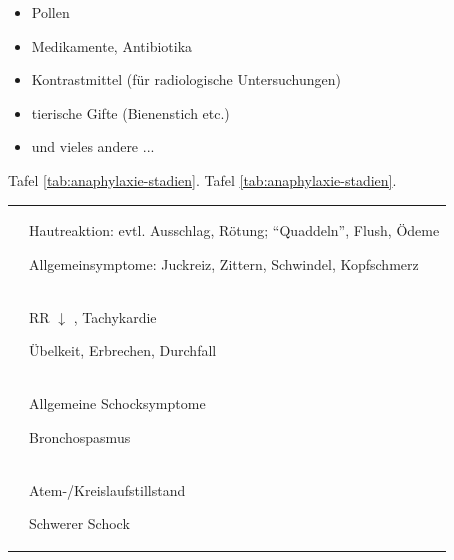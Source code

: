{
\begin{itemize}
    \item Pollen
    \item Medikamente, Antibiotika
    \item Kontrastmittel (für radiologische Untersuchungen)
    \item tierische Gifte (Bienenstich etc.)
    \item und vieles andere ...
\end{itemize}
}{}{}{}{}


\MarriedNG{\TxSymptome}
{
Tafel \ref{tab:anaphylaxie-stadien}.
}
{
Tafel \ref{tab:anaphylaxie-stadien}.
}


\begin{table}[H]
\begin{tabulary}{\linewidth}[H]{cL}
 &
\\\toprule
{}
 &
Hautreaktion: evtl. Ausschlag, Rötung;
"`Quaddeln"', Flush, Ödeme

Allgemeinsymptome: Juckreiz, Zittern, Schwindel, Kopfschmerz

\\\addlinespace
{}

 &
RR ${\downarrow}$  , Tachykardie

Übelkeit, Erbrechen, Durchfall 

\\\addlinespace
{}
 &
Allgemeine Schocksymptome

Bronchospasmus
\\\addlinespace
{}
 &
Atem-/Kreislaufstillstand

Schwerer Schock
\\\bottomrule
\end{tabulary}
\end{table}




